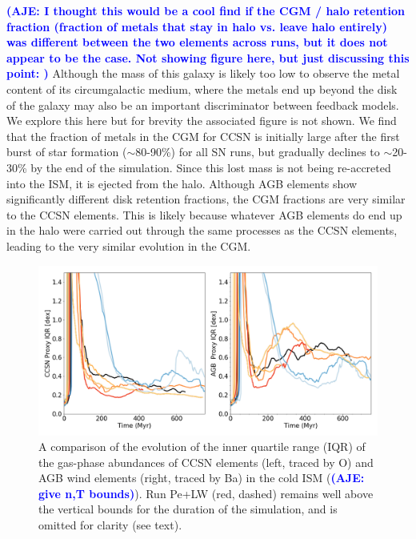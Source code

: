 \documentclass[twocolumn]{aastex62}
\newcommand{\pelwstyle}{red, dashed}
\newcommand{\aje}[1]{\textcolor{blue}{\textbf{(AJE: #1)}}}
\begin{document}
\aje{I thought this would be a cool find if the CGM / halo retention fraction (fraction of metals that stay in halo vs. leave halo entirely) was different between the two elements across runs, but it does not appear to be the case. Not showing figure here, but just discussing this point: } Although the mass of this galaxy is likely too low to observe the metal content of its circumgalactic medium, where the metals end up beyond the disk of the galaxy may also be an important discriminator between feedback models. We explore this here but for brevity the associated figure is not shown. We find that the fraction of metals in the CGM for CCSN is initially large after the first burst of star formation ($\sim$80-90\%) for all SN runs, but gradually declines to $\sim$20-30\% by the end of the simulation. Since this lost mass is not being re-accreted into the ISM, it is ejected from the halo. Although AGB elements show significantly different disk retention fractions, the CGM fractions are very similar to the CCSN elements. This is likely because whatever AGB elements do end up in the halo were carried out through the same processes as the CCSN elements, leading to the very similar evolution in the CGM.


\begin{figure}
  \centering
  \includegraphics[width=0.95\linewidth]{figures/physics_comparison_IQR}
  \caption{A comparison of the evolution of the inner quartile range (IQR) of the gas-phase abundances of CCSN elements (left, traced by O) and AGB wind elements (right, traced by Ba) in the cold ISM (\aje{give n,T bounds}). Run Pe+LW (\pelwstyle) remains well above the vertical bounds for the duration of the simulation, and is omitted for clarity (see text).}
  \label{fig:mixing}
\end{figure}
\end{document}
